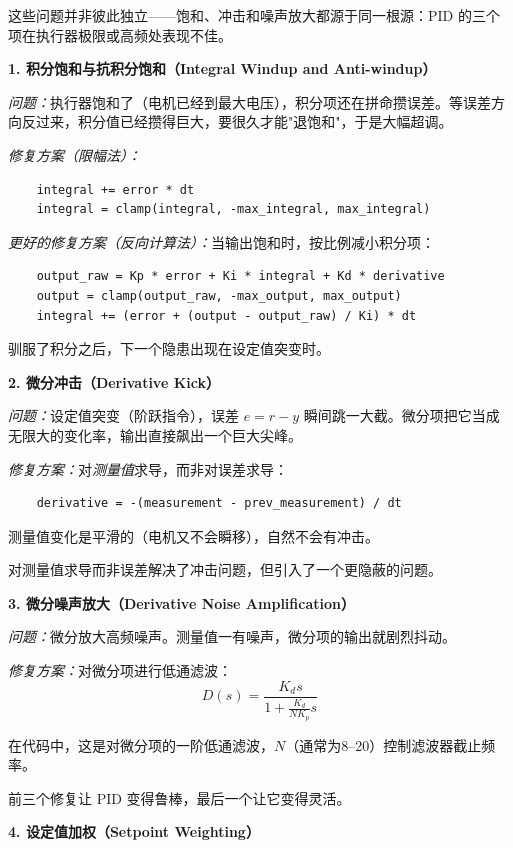 这些问题并非彼此独立——饱和、冲击和噪声放大都源于同一根源：PID 的三个项在执行器极限或高频处表现不佳。

\textbf{1. 积分饱和与抗积分饱和（Integral Windup and Anti-windup）}

\textit{问题：}执行器饱和了（电机已经到最大电压），积分项还在拼命攒误差。等误差方向反过来，积分值已经攒得巨大，要很久才能"退饱和"，于是大幅超调。

\textit{修复方案（限幅法）：}
\begin{verbatim}
    integral += error * dt
    integral = clamp(integral, -max_integral, max_integral)
\end{verbatim}

\textit{更好的修复方案（反向计算法）：}当输出饱和时，按比例减小积分项：
\begin{verbatim}
    output_raw = Kp * error + Ki * integral + Kd * derivative
    output = clamp(output_raw, -max_output, max_output)
    integral += (error + (output - output_raw) / Ki) * dt
\end{verbatim}

驯服了积分之后，下一个隐患出现在设定值突变时。

\textbf{2. 微分冲击（Derivative Kick）}

\textit{问题：}设定值突变（阶跃指令），误差 $e = r - y$ 瞬间跳一大截。微分项把它当成无限大的变化率，输出直接飙出一个巨大尖峰。

\textit{修复方案：}对\textit{测量值}求导，而非对误差求导：
\begin{verbatim}
    derivative = -(measurement - prev_measurement) / dt
\end{verbatim}

测量值变化是平滑的（电机又不会瞬移），自然不会有冲击。

对测量值求导而非误差解决了冲击问题，但引入了一个更隐蔽的问题。

\textbf{3. 微分噪声放大（Derivative Noise Amplification）}

\textit{问题：}微分放大高频噪声。测量值一有噪声，微分项的输出就剧烈抖动。

\textit{修复方案：}对微分项进行低通滤波：
\begin{equation}
D(s) = \frac{K_d s}{1 + \frac{K_d}{N K_p} s}
\end{equation}

在代码中，这是对微分项的一阶低通滤波，$N$（通常为8--20）控制滤波器截止频率。

前三个修复让 PID 变得鲁棒，最后一个让它变得灵活。

\textbf{4. 设定值加权（Setpoint Weighting）}

